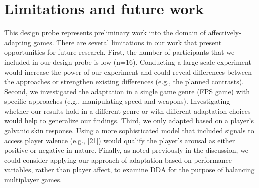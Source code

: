 \section{Limitations and future work}
This design probe represents preliminary work into the domain of affectively-adapting games. There are several limitations in our work that present opportunities for future research. First, the number of participants that we included in our design probe is low (n=16).  Conducting a large-scale experiment would increase the power of our experiment and could reveal differences between the approaches or strengthen existing differences (e.g., the planned contrasts). Second, we investigated the adaptation in a single game genre (FPS game) with specific approaches (e.g., manipulating speed and weapons). Investigating whether our results hold in a different genre or with different adaptation choices would help to generalize our findings. Third, we only adapted based on a player’s galvanic skin response. Using a more sophisticated model that included signals to access player valence (e.g., [21]) would qualify the player’s arousal as either positive or negative in nature. Finally, as noted previously in the discussion, we could consider applying our approach of adaptation based on performance variables, rather than player affect, to examine DDA for the purpose of balancing multiplayer games.
